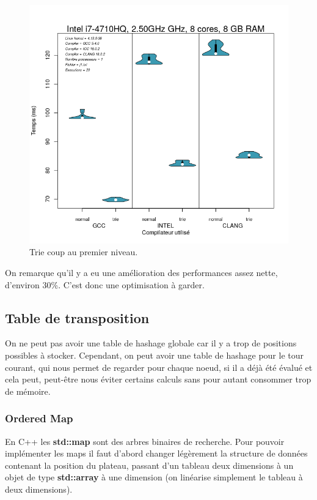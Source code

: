 \documentclass[
 aip,
 jmp,
 amsmath,amssymb,
 reprint
]{revtex4-1}
\begin{document}
\begin{figure}[H]
  \includegraphics[width=\linewidth, keepaspectratio=true]{trie.png}
  \caption{Trie coup au premier niveau.\label{Fig:trie_coup}}
\end{figure}

On remarque qu'il y a eu une amélioration des performances assez nette, d'environ 30\%. C'est donc une optimisation à garder.

\subsection{Table de transposition}
On ne peut pas avoir une table de hashage globale car il y a trop de positions possibles à stocker. Cependant, on peut avoir une table de hashage pour le tour courant, qui nous permet de regarder pour chaque noeud, si il a déjà été évalué et cela peut, peut-être nous éviter certains calculs sans pour autant consommer trop de mémoire.

\subsubsection{Ordered Map}
En C++ les \textbf{std::map} sont des arbres binaires de recherche. Pour pouvoir implémenter les maps il faut d'abord changer légèrement la structure de données contenant la position du plateau, passant d'un tableau deux dimensions à un objet de type \textbf{std::array} à une dimension (on linéarise simplement le tableau à deux dimensions).
\end{document}

